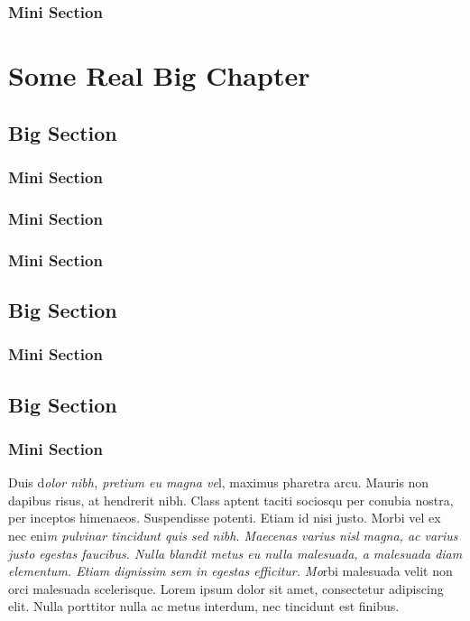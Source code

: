 \documentclass[12pt,a4paper]{report}
\begin{document}
\subsection{Mini Section}
\chapter{Some Real Big Chapter}
\section{Big Section}
\subsection{Mini Section}
\subsection{Mini Section}
\subsection{Mini Section}
\section{Big Section}
\subsection{Mini Section}
\section{Big Section}
\subsection{Mini Section}

Duis d\emph{olor nibh, pretium eu magna ve}l, maximus pharetra arcu. Mauris non dapibus risus, at hendrerit nibh. Class aptent {\color{minor} taciti sociosqu  per conubia nostra, per inceptos himenaeos. Suspendisse potenti. Etiam }id nisi justo. Morbi vel ex nec eni\emph{m pulvinar tincidunt quis sed nibh. Maecenas varius nisl magna, ac varius justo egestas faucibus. Nulla blandit metus eu nulla malesuada, a malesuada diam elementum. Etiam dignissim sem in egestas efficitur. Mo}rbi malesuada velit non orci malesuada scelerisque. Lorem ipsum dolor sit amet, consectetur adipiscing {\color{minimal} elit. Nulla porttitor nulla ac metus interdum, nec tincidunt est finibus.}
\end{document}
